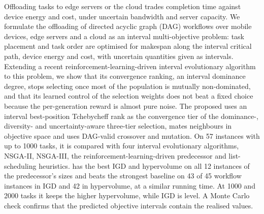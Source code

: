 Offloading tasks to edge servers or the cloud trades completion time against device energy and cost, under uncertain
bandwidth and server capacity. We formulate the offloading of directed acyclic graph (DAG) workflows over mobile devices,
edge servers and a cloud as an interval multi-objective problem: task placement and task order are optimised for
makespan along the interval critical path, device energy and cost, with uncertain quantities given as intervals.
Extending a recent reinforcement-learning-driven interval evolutionary algorithm to this problem, we show that its
convergence ranking, an interval dominance degree, stops selecting once most of the population is mutually
non-dominated, and that its learned control of the selection weights does not beat a fixed choice because the
per-generation reward is almost pure noise. The proposed \ours{} uses an interval best-position Tchebycheff rank as the
convergence tier of the dominance-, diversity- and uncertainty-aware three-tier selection, mates neighbours in
objective space and uses DAG-valid crossover and mutation. On 57 instances with up to 1000 tasks, it is compared with
four interval evolutionary algorithms, NSGA-II, NSGA-III, the reinforcement-learning-driven predecessor and
list-scheduling heuristics. \ours{} has the best IGD and hypervolume on all 12 instances of the predecessor's sizes and
beats the strongest baseline on 43 of 45 workflow instances in IGD and 42 in hypervolume, at a similar running time.
At 1000 and 2000 tasks it keeps the higher hypervolume, while IGD is level. A Monte Carlo check confirms that the
predicted objective intervals contain the realised values.
